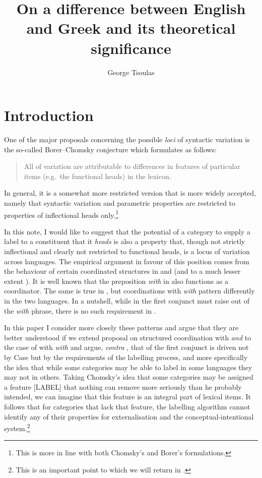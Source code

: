 \documentclass[output=paper]{langsci/langscibook}
\author{George Tsoulas\affiliation{University of York}}
\title{On a difference between English and Greek and its theoretical significance}
\begin{document}
\glsresetall

\section{Introduction}

One of the major proposals concerning the possible \emph{loci} of syntactic
variation is the so-called Borer--Chomsky conjecture
which \citet{Baker2008b} formulates as follows:

\begin{quote}
All  of variation are attributable to differences in features of
particular items (e.g.\ the functional heads) in the lexicon.
\end{quote}

In general, it is a somewhat more restricted version that is more widely
accepted, namely that syntactic variation and parametric properties are
restricted to properties of inflectional heads only.\footnote{This is more in
line with both Chomsky's and Borer's formulations.}

In this note, I would like to suggest that the potential of a category to
supply a label to a constituent that it \emph{heads} is also a property that,
though not strictly inflectional and clearly not restricted to functional
heads, is a locus of variation across languages. The empirical argument in
favour of this position comes from the behaviour of certain coordinated
structures in  and  (and to a much lesser extent
). It is well known that the preposition \emph{with} in
 also functions as a coordinator. The same is true in ,
but coordinations with \emph{with} pattern differently in the two languages. In
a nutshell, while in  the first conjunct must raise out of the
\emph{with} phrase, there is no such requirement in .

In this paper I consider more closely these patterns and argue that they are
better understood if we extend  proposal on structured
coordination with \emph{and} to the case of  with \emph{with}
and argue, \emph{contra} \citet{Kayne1994}, that  of the first
conjunct is driven not by Case but by the requirements of the
labelling process, and more specifically the idea that while some
categories may be able to label in some languages they may not in others.
Taking Chomsky's idea that some categories may be assigned a feature [LABEL]
that nothing can remove more seriously than he probably intended, we can
imagine that this feature is an integral part of lexical items. It follows that
for categories that lack that feature, the labelling algorithm cannot identify
any of their properties for externalisation and the conceptual-intentional
system.\footnote{This is an important point to which we will return in
.}
\end{document}
